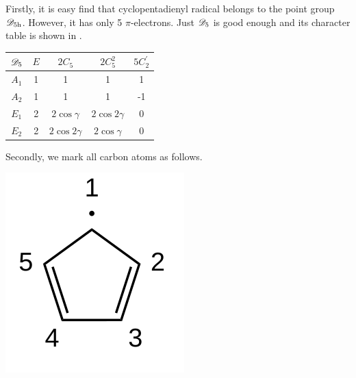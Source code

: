Firstly, it is easy find that cyclopentadienyl radical belongs to the point group $\mathscr{D}_{\rm 5h}$. However, it has only 5 $\pi$-electrons. Just $\mathscr{D}_{\rm 5}$ is good enough and its character table is shown in .
		\begin{center}
		\setlength{\abovecaptionskip}{0em}
		\label{tab:chatab_4}
		\begin{tabular}{ccccc}\hline
	$\mathscr{D}_{\rm 5}$ & $E$ & $2C_5$ &	$2C^2_5$	& $5C^\prime_2$ \\ \hline
			$A_1$	&	1	&	1	&	1	&	1	\\
			$A_2$	&	1	&	1	&	1	&	-1	\\
			$E_1$ 	&	2	&$2\cos\gamma$	&	$2\cos2\gamma$	&	0	\\
			$E_2$ 	&	2	&$2\cos2\gamma$	&	$2\cos\gamma$	&	0	\\ \hline
		\end{tabular}
		\end{center}
		
		Secondly, we mark all carbon atoms as follows.
		\begin{center}
		\includegraphics[scale=1.0]{./structures/exercise_1/cyclopentadienyl_radical/0.png}
		\setlength{\abovecaptionskip}{-0.3em}
		\setlength{\belowcaptionskip}{-0.8em}
		\end{center}				

